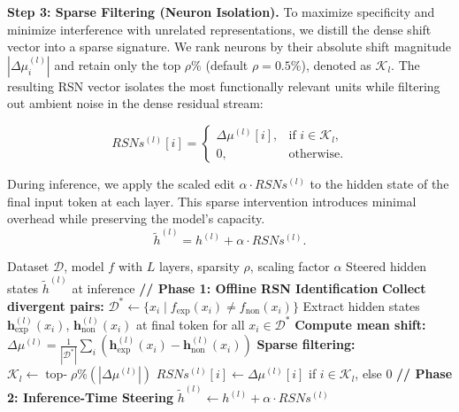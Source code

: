 \documentclass{article}
\begin{document}
\textbf{Step 3: Sparse Filtering (Neuron Isolation).}
To maximize specificity and minimize interference with unrelated representations, we distill the dense shift vector into a sparse signature. We rank neurons by their absolute shift magnitude $|\Delta \mu^{(l)}_i|$ and retain only the top $\rho\%$ (default $\rho=0.5\%$), denoted as $\mathcal{K}_l$. The resulting RSN vector isolates the most functionally relevant units while filtering out ambient noise in the dense residual stream:

$$RSNs^{(l)}[i] =
\begin{cases}
\Delta \mu^{(l)}[i], & \text{if } i \in \mathcal{K}_l,\\
0, & \text{otherwise.}
\end{cases}$$

During inference, we apply the scaled edit $\alpha \cdot RSNs^{(l)}$ to the hidden state of the final input token at each layer. This sparse intervention introduces minimal overhead while preserving the model’s capacity.
\[
\tilde{h}^{(l)} = h^{(l)} + \alpha \cdot RSNs^{(l)}.
\]

\begin{algorithm}[t]
\small
\caption{RSN Identification and Inference-Time Steering}
\label{alg:rsn}
\begin{algorithmic}[1]
\Require Dataset $\mathcal{D}$, model $f$ with $L$ layers, sparsity $\rho$, scaling factor $\alpha$
\Ensure Steered hidden states $\tilde{h}^{(l)}$ at inference
\State \textbf{// Phase 1: Offline RSN Identification}
\State \textbf{Collect divergent pairs:} $\mathcal{D}^* \leftarrow \{x_i \mid f_{\text{exp}}(x_i) \neq f_{\text{non}}(x_i)\}$
    \State Extract hidden states $\mathbf{h}^{(l)}_{\text{exp}}(x_i)$, $\mathbf{h}^{(l)}_{\text{non}}(x_i)$ at final token for all $x_i \in \mathcal{D}^*$
    \State \textbf{Compute mean shift:} $\Delta\mu^{(l)} = \frac{1}{|\mathcal{D}^*|}\sum_{i} \left(\mathbf{h}^{(l)}_{\text{exp}}(x_i) - \mathbf{h}^{(l)}_{\text{non}}(x_i)\right)$
    \State \textbf{Sparse filtering:} $\mathcal{K}_l \leftarrow \operatorname{top\text{-}}\rho\%\left(|\Delta\mu^{(l)}|\right)$
    \State $RSNs^{(l)}[i] \leftarrow \Delta\mu^{(l)}[i]$ if $i \in \mathcal{K}_l$, else $0$
\EndFor
\State \textbf{// Phase 2: Inference-Time Steering}
    \State $\tilde{h}^{(l)} \leftarrow h^{(l)} + \alpha \cdot RSNs^{(l)}$
\EndFor
\end{algorithmic}
\end{algorithm}
\end{document}
